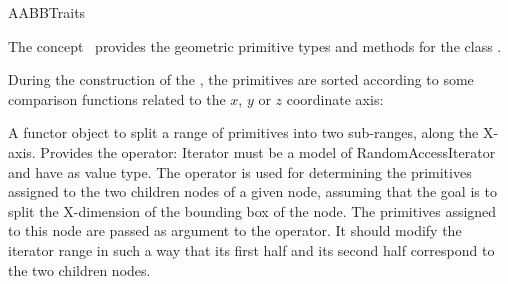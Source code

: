 \ccRefPageBegin


\begin{ccRefConcept}{AABBTraits}


\ccDefinition
  
The concept \ccRefName\ provides the geometric primitive types and methods for the class .

\ccTypes










During the construction of the , the primitives are sorted according to some comparison functions related to the $x$, $y$ or $z$ coordinate axis:

{A functor object to split a range of primitives into two sub-ranges, along the X-axis. Provides the operator:
 Iterator  must be a model of RandomAccessIterator and have  as value type. The operator is used for determining the primitives assigned to the two children nodes of a given node, assuming that the goal is to split the X-dimension of the bounding box of the node. The primitives assigned to this node are passed as argument to the operator. It should modify the iterator range in such a way that its first half and its second half correspond to the two children nodes.}


\end{ccRefConcept}
